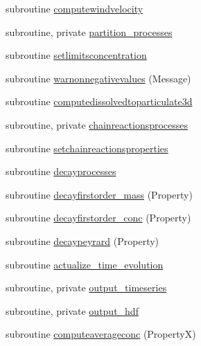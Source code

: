 \begin{DoxyCompactItemize}
\item 
subroutine \mbox{\hyperlink{namespacemoduleporousmediaproperties_aad02f0ad0e6d8ad5f7cd959e38c17fa7}{computewindvelocity}}
\item 
subroutine, private \mbox{\hyperlink{namespacemoduleporousmediaproperties_a8875ae5fa2c63a9d71875b7fd07addfb}{partition\+\_\+processes}}
\item 
subroutine \mbox{\hyperlink{namespacemoduleporousmediaproperties_aa132ced55703c339565649a0065925da}{setlimitsconcentration}}
\item 
subroutine \mbox{\hyperlink{namespacemoduleporousmediaproperties_a457fa586000763f38ce30bbaf81de100}{warnonnegativevalues}} (Message)
\item 
subroutine \mbox{\hyperlink{namespacemoduleporousmediaproperties_a2438c1ae6e14a9ddbc08eda6cd410daf}{computedissolvedtoparticulate3d}}
\item 
subroutine, private \mbox{\hyperlink{namespacemoduleporousmediaproperties_aa89aee3f1e3ab0673669acd8126824f9}{chainreactionsprocesses}}
\item 
subroutine \mbox{\hyperlink{namespacemoduleporousmediaproperties_a4eef1ed87ef643f7f98c8302286a6eb1}{setchainreactionsproperties}}
\item 
subroutine \mbox{\hyperlink{namespacemoduleporousmediaproperties_a09a5fbeb9b55249ae5b934510525a8ff}{decayprocesses}}
\item 
subroutine \mbox{\hyperlink{namespacemoduleporousmediaproperties_accf60e0dd2d0f11fb4815a77bd7db219}{decayfirstorder\+\_\+mass}} (Property)
\item 
subroutine \mbox{\hyperlink{namespacemoduleporousmediaproperties_a3c5193c49fa27b216424d2162798b41b}{decayfirstorder\+\_\+conc}} (Property)
\item 
subroutine \mbox{\hyperlink{namespacemoduleporousmediaproperties_a9e4d029f1da0a9fa9ea00b76a2a21ffd}{decaypeyrard}} (Property)
\item 
subroutine \mbox{\hyperlink{namespacemoduleporousmediaproperties_a2538954ade5763189d6d5f04ad4e7882}{actualize\+\_\+time\+\_\+evolution}}
\item 
subroutine, private \mbox{\hyperlink{namespacemoduleporousmediaproperties_a23e72e1a1d3d2dc5b268bbc65dbeebed}{output\+\_\+timeseries}}
\item 
subroutine, private \mbox{\hyperlink{namespacemoduleporousmediaproperties_afc8549b6ebf2207ac8a080ad892a6cd3}{output\+\_\+hdf}}
\item 
subroutine \mbox{\hyperlink{namespacemoduleporousmediaproperties_ab84b0ba6c0a1df355fb649c05128fbb3}{computeaverageconc}} (PropertyX)

\end{DoxyCompactItemize}
